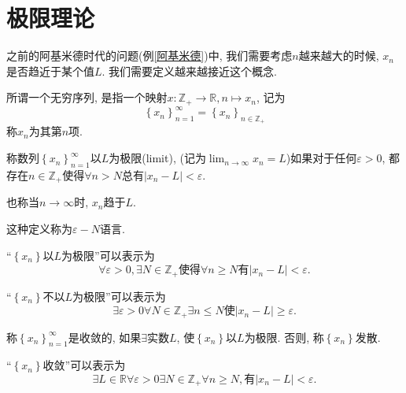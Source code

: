 
\section{极限理论}

之前的阿基米德时代的问题(例\ref{阿基米德})中, 我们需要考虑$n$越来越大的时候, $x_n$是否趋近于某个值$L$. 我们需要定义越来越接近这个概念.

\begin{definition}
    所谓一个无穷序列, 是指一个映射$x\colon \mathbb{Z}_{+} \to \mathbb{R}, n \mapsto x_n$, 记为
    \begin{equation}
      \left\{ x_n \right\} _{n=1}^{\infty} = \left\{ x_n \right\} _{n \in \mathbb{Z}_{+}}
    \end{equation}
    称$x_n$为其第$n$项.
\end{definition}

\begin{definition}
    称数列$\left\{ x_n \right\} _{n=1}^{\infty}$以$L$为极限(limit), (记为$\displaystyle \lim_{n \to \infty}x_n = L$)如果对于任何$\varepsilon> 0$, 都存在$n \in \mathbb{Z}_{+}$使得$\forall n>N$总有$|x_n - L| <\varepsilon$.

    也称当$n\to \infty$时, $x_n$趋于$L$.

    这种定义称为$\varepsilon - N$语言.
\end{definition}
``$\left\{ x_n \right\} $以$L$为极限''可以表示为
\begin{equation}
  \forall \varepsilon > 0 ,\exists N \in \mathbb{Z}_{+}\text{使得} \forall n\ge N \text{有} |x_n - L| < \varepsilon.
\end{equation}

``$\left\{ x_n \right\} $不以$L$为极限''可以表示为
\begin{equation}
  \exists \varepsilon>0  \forall N\in \mathbb{Z}_{+} \exists n \le N \text{使}|x_n-L|\ge \varepsilon.
\end{equation}

\begin{definition}
    称$\left\{ x_n \right\} _{n=1}^{\infty}$是收敛的, 如果$\exists $实数$L$, 使$\left\{ x_n \right\} $以$L$为极限.
    否则, 称$\left\{ x_n \right\} $发散.
\end{definition}

``$\left\{ x_n \right\} $收敛''可以表示为
\begin{equation}
  \exists  L \in \mathbb{R} \forall \varepsilon >0 \exists N \in \mathbb{Z}_{+} \forall n \ge  N, \text{有} |x_n-L|<\varepsilon.
\end{equation}

